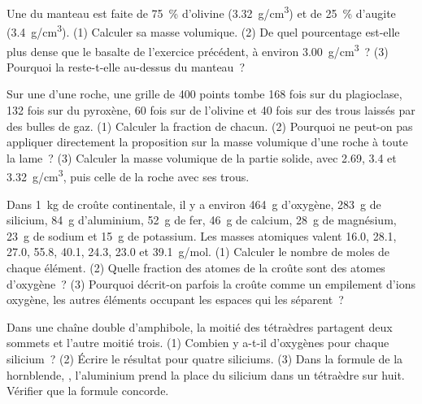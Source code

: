 \begin{exercise}[$\star\star$]\label{exo:g11:minerals:10}
Une  du manteau est faite de \qty{75}{\percent} d'olivine
(\qty{3.32}{g/cm^3}) et de \qty{25}{\percent} d'augite (\qty{3.4}{g/cm^3}).
(1) Calculer sa masse volumique. (2) De quel pourcentage est-elle plus
dense que le basalte de l'exercice précédent, à environ \qty{3.00}{g/cm^3}~?
(3) Pourquoi la  reste-t-elle au-dessus du manteau~?
\end{exercise}

\begin{exercise}[$\star\star$]\label{exo:g11:minerals:11}
Sur une  d'une roche, une grille de 400 points tombe 168 fois sur
du plagioclase, 132 fois sur du pyroxène, 60 fois sur de l'olivine et
40 fois sur des trous laissés par des bulles de gaz. (1) Calculer la
fraction de chacun. (2) Pourquoi ne peut-on pas appliquer directement la
proposition sur la masse volumique d'une roche à toute la lame~?
(3) Calculer la masse volumique de la partie solide, avec \qty{2.69}{},
\qty{3.4}{} et \qty{3.32}{g/cm^3}, puis celle de la roche avec ses trous.
\end{exercise}

\begin{exercise}[$\star\star\star$]\label{exo:g11:minerals:12}
Dans \qty{1}{kg} de croûte continentale, il y a environ \qty{464}{g}
d'oxygène, \qty{283}{g} de silicium, \qty{84}{g} d'aluminium, \qty{52}{g}
de fer, \qty{46}{g} de calcium, \qty{28}{g} de magnésium, \qty{23}{g} de
sodium et \qty{15}{g} de potassium. Les masses atomiques valent
\qty{16.0}{}, \qty{28.1}{}, \qty{27.0}{}, \qty{55.8}{}, \qty{40.1}{},
\qty{24.3}{}, \qty{23.0}{} et \qty{39.1}{g/mol}. (1) Calculer le nombre de
moles de chaque élément. (2) Quelle fraction des atomes de la croûte sont
des atomes d'oxygène~? (3) Pourquoi décrit-on parfois la croûte comme un
empilement d'ions oxygène, les autres éléments occupant les espaces qui les
séparent~?
\end{exercise}

\begin{exercise}[$\star\star\star$]\label{exo:g11:minerals:13}
Dans une chaîne double d'amphibole, la moitié des tétraèdres partagent deux
sommets et l'autre moitié trois. (1) Combien y a-t-il d'oxygènes pour chaque
silicium~? (2) Écrire le résultat pour quatre siliciums. (3) Dans la
formule de la hornblende,
, l'aluminium prend la place du silicium
dans un tétraèdre sur huit. Vérifier que la formule concorde.
\end{exercise}

